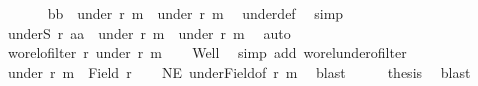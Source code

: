 \begin{isabellebody}
\ \ \ \ \ \isamarkupfalse%
\ {\isachardoublequoteopen}{\isacharparenleft}{\kern0pt}b{}{\isacharcomma}{\kern0pt}b{}{\isacharparenright}{\kern0pt}\ {\isasymin}\ {\isacharparenleft}{\kern0pt}under\ r\ {\isacharquery}{\kern0pt}m{\isacharparenright}{\kern0pt}\ {\isasymtimes}\ {\isacharparenleft}{\kern0pt}under\ r\ {\isacharquery}{\kern0pt}m{\isacharparenright}{\kern0pt}{\isachardoublequoteclose}\ \isamarkupfalse%
\ under{\isacharunderscore}{\kern0pt}def\ \isamarkupfalse%
\ simp\isacommand{{\isacharbraceright}{\kern0pt}}\isamarkupfalse%
\isanewline
\ \ \ \ \ \isamarkupfalse%
\ {\isachardoublequoteopen}underS\ {\isacharquery}{\kern0pt}r{\isacharprime}{\kern0pt}\ {\isacharparenleft}{\kern0pt}a{}{\isacharcomma}{\kern0pt}a{}{\isacharparenright}{\kern0pt}\ {\isasymle}\ {\isacharparenleft}{\kern0pt}under\ r\ {\isacharquery}{\kern0pt}m{\isacharparenright}{\kern0pt}\ {\isasymtimes}\ {\isacharparenleft}{\kern0pt}under\ r\ {\isacharquery}{\kern0pt}m{\isacharparenright}{\kern0pt}{\isachardoublequoteclose}\ \isamarkupfalse%
\ auto\isanewline
\ \ \isamarkupfalse%
\isanewline
\ \ \isamarkupfalse%
\ \isamarkupfalse%
\ {\isachardoublequoteopen}wo{\isacharunderscore}{\kern0pt}rel{\isachardot}{\kern0pt}ofilter\ r\ {\isacharparenleft}{\kern0pt}under\ r\ {\isacharquery}{\kern0pt}m{\isacharparenright}{\kern0pt}{\isachardoublequoteclose}\isanewline
\ \ \isamarkupfalse%
\ Well\ \isamarkupfalse%
\ {\isacharparenleft}{\kern0pt}simp\ add{\isacharcolon}{\kern0pt}\ wo{\isacharunderscore}{\kern0pt}rel{\isachardot}{\kern0pt}under{\isacharunderscore}{\kern0pt}ofilter{\isacharparenright}{\kern0pt}\isanewline
\ \ \isamarkupfalse%
\ \isamarkupfalse%
\ {\isachardoublequoteopen}under\ r\ {\isacharquery}{\kern0pt}m\ {\isacharless}{\kern0pt}\ Field\ r{\isachardoublequoteclose}\isanewline
\ \ \isamarkupfalse%
\ NE\ under{\isacharunderscore}{\kern0pt}Field{\isacharbrackleft}{\kern0pt}of\ r\ {\isacharquery}{\kern0pt}m{\isacharbrackright}{\kern0pt}\ \isamarkupfalse%
\ blast\isanewline
\ \ \isamarkupfalse%
\ \isamarkupfalse%
\ {\isacharquery}{\kern0pt}thesis\ \isamarkupfalse%
\ blast\isanewline
{}\isamarkupfalse%
%
\endisatagproof
{\isafoldproof}%
%
\isadelimproof
\isanewline
%
\endisadelimproof
\isanewline
{}\isamarkupfalse%

\end{isabellebody}
